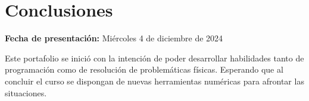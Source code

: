 \documentclass[../portafolio.tex]{subfiles}
\begin{document}
\chapter*{Conclusiones}

\hfill \textbf{Fecha de presentación:} Miércoles 4 de diciembre de 2024

\medskip


Este portafolio se inició con la intención de poder desarrollar habilidades tanto de programación como de resolución de problemáticas físicas. Esperando que al concluir el curso se dispongan de nuevas herramientas numéricas para afrontar las situaciones.
\end{document}
